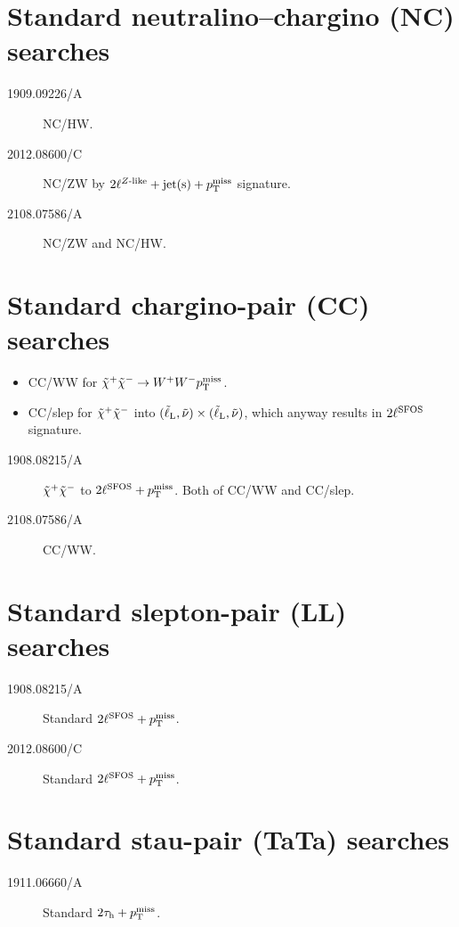 \section[Standard NC searches]{Standard neutralino--chargino (NC) searches}

\begin{description}
\item[1909.09226/A] NC/HW.
\item[2012.08600/C] NC/ZW by $2\ell\wZlike+\text{jet(s)}+\mpT$ signature.
\item[2108.07586/A] NC/ZW and NC/HW.
\end{description}


\section[Standard CC searches]{Standard chargino-pair (CC) searches}
\begin{itemize}
 \item CC/WW for $\charP\charM\to W^+W^-\mpT$.
 \item CC/slep for $\tilde\chi^+_{\relax}\tilde\chi^-_{\relax}$ into $(\slepL,\snu)\times(\slepL,\snu)$, which anyway results in $2\ell\wSFOS$ signature.
\end{itemize}


\begin{description}
\item[1908.08215/A] $\tilde\chi^+_{\relax}\tilde\chi^-_{\relax}$ to $2\ell\wSFOS+\mpT$. Both of CC/WW and CC/slep.
\item[2108.07586/A] CC/WW.
\end{description}



\section[Standard LL searches]{Standard slepton-pair (LL) searches}
\begin{description}
\item[1908.08215/A] Standard $2\ell\wSFOS+\mpT$.
\item[2012.08600/C] Standard $2\ell\wSFOS+\mpT$.
\end{description}

\section[Standard TaTa searches]{Standard stau-pair (TaTa) searches}
\begin{description}
\item[1911.06660/A] Standard $2\tauh+\mpT$.
\end{description}



